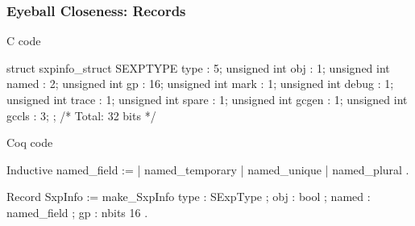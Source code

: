 \documentclass{beamer}
\begin{document}
\begin{frame}[fragile]
    \frametitle{Eyeball Closeness: Records}

        \begin{widemargin}
            \centering{}
    \begin{minipage}{.5\textwidth}
        C code

\begin{ccode}
struct sxpinfo_struct {
  SEXPTYPE type      :  5;
  unsigned int obj   :  1;
  unsigned int named :  2;
  unsigned int gp    : 16;
  unsigned int mark  :  1;
  unsigned int debug :  1;
  unsigned int trace :  1;
  unsigned int spare :  1;
  unsigned int gcgen :  1;
  unsigned int gccls :  3;
};
/* Total: 32 bits */
\end{ccode}

    \end{minipage}
    \qquad
    \begin{minipage}{.47\textwidth}
        Coq code

\begin{coqcode}
Inductive named_field :=
  | named_temporary
  | named_unique
  | named_plural
  .

Record SxpInfo :=
  make_SxpInfo {
    type : SExpType ;
    obj : bool ;
    named : named_field ;
    gp : nbits 16
  }.
\end{coqcode}

    \end{minipage}
    \end{widemargin}


\end{frame}
\end{document}
